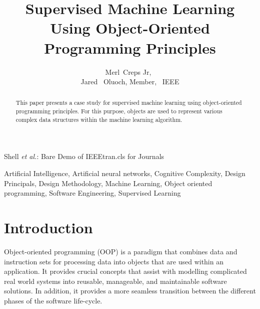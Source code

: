 \documentclass[journal]{IEEEtran}
\begin{document}
\title{Supervised Machine Learning Using Object-Oriented Programming Principles}
\author{Merl~Creps Jr,~\\
Jared ~Oluoch, Member, ~IEEE}%

%
{Shell \MakeLowercase{\textit{et al.}}: Bare Demo of IEEEtran.cls for Journals}

\maketitle


\begin{abstract}
This paper presents a case study for supervised machine learning using object-oriented programming principles. For this purpose, objects are used to represent various complex data structures within the machine learning algorithm. 
\end{abstract}


\begin{IEEEkeywords}
Artificial Intelligence, Artificial neural networks, Cognitive Complexity, Design Principals, Design Methodology, Machine Learning, Object oriented programming, Software Engineering, Supervised Learning
\end{IEEEkeywords}

%
\IEEEpeerreviewmaketitle


\section{Introduction}
Object-oriented programming (OOP) is a paradigm that combines data and instruction sets for processing data into objects that are used within an application. It provides crucial concepts that assist with modelling complicated real world systems into reusable, manageable, and maintainable software solutions.  In addition, it provides a more seamless transition between the different phases of the software life-cycle.
\end{document}
